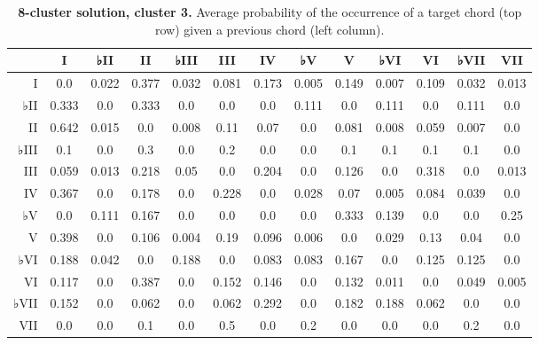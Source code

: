 \begin{table}[htbp]
\begin{minipage}{\linewidth}
\setlength{\tymax}{0.5\linewidth}
\centering
\small
\caption{\textbf{8-cluster solution, cluster 3.} Average probability of the occurrence of a target chord (top row) given a previous chord (left column).}
\label{8-clustersolutioncluster3.averageprobabilityoftheoccurrenceofatargetchordtoprowgivenapreviouschordleftcolumn.}
\begin{tabulary}{\textwidth}{@{}RCCCCCCCCCCCC@{}} \toprule
&I&♭II&II&♭III&III&IV&♭V&V&♭VI&VI&♭VII&VII\\
\midrule
I&0.0&0.022&0.377&0.032&0.081&0.173&0.005&0.149&0.007&0.109&0.032&0.013\\
♭II&0.333&0.0&0.333&0.0&0.0&0.0&0.111&0.0&0.111&0.0&0.111&0.0\\
II&0.642&0.015&0.0&0.008&0.11&0.07&0.0&0.081&0.008&0.059&0.007&0.0\\
♭III&0.1&0.0&0.3&0.0&0.2&0.0&0.0&0.1&0.1&0.1&0.1&0.0\\
III&0.059&0.013&0.218&0.05&0.0&0.204&0.0&0.126&0.0&0.318&0.0&0.013\\
IV&0.367&0.0&0.178&0.0&0.228&0.0&0.028&0.07&0.005&0.084&0.039&0.0\\
♭V&0.0&0.111&0.167&0.0&0.0&0.0&0.0&0.333&0.139&0.0&0.0&0.25\\
V&0.398&0.0&0.106&0.004&0.19&0.096&0.006&0.0&0.029&0.13&0.04&0.0\\
♭VI&0.188&0.042&0.0&0.188&0.0&0.083&0.083&0.167&0.0&0.125&0.125&0.0\\
VI&0.117&0.0&0.387&0.0&0.152&0.146&0.0&0.132&0.011&0.0&0.049&0.005\\
♭VII&0.152&0.0&0.062&0.0&0.062&0.292&0.0&0.182&0.188&0.062&0.0&0.0\\
VII&0.0&0.0&0.1&0.0&0.5&0.0&0.2&0.0&0.0&0.0&0.2&0.0\\

\bottomrule

\end{tabulary}
\end{minipage}
\end{table}

